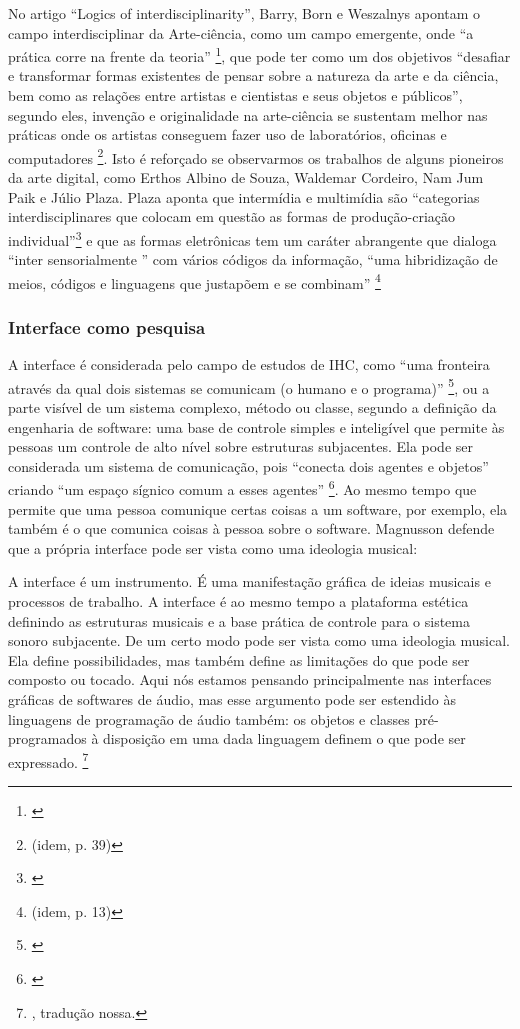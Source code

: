 No artigo ``Logics of interdisciplinarity'', Barry, Born e Weszalnys apontam o campo interdisciplinar da Arte-ciência, como um campo emergente, onde ``a prática corre na frente da teoria'' \footnote{\cite{Barry2008}}, que pode ter como um dos objetivos ``desafiar e transformar formas existentes de pensar sobre a natureza da arte e da ciência, bem como as relações entre artistas e cientistas e seus objetos e públicos'', segundo eles, invenção e originalidade na arte-ciência se sustentam melhor nas práticas onde os artistas conseguem fazer uso de laboratórios, oficinas e computadores \footnote{(idem, p. 39)}. Isto é reforçado se observarmos os trabalhos de alguns pioneiros da arte digital, como Erthos Albino de Souza, Waldemar Cordeiro, Nam Jum Paik e Júlio Plaza. 
Plaza aponta que intermídia e multimídia são ``categorias interdisciplinares  que colocam em questão as formas de produção-criação individual''\footnote{\cite[66]{JulioPlaza1969}} e que as formas eletrônicas tem um caráter abrangente que dialoga ``inter sensorialmente '' com vários códigos da informação, ``uma hibridização de meios, códigos e linguagens que justapõem e se combinam'' \footnote{(idem, p. 13)}




\subsubsection{Interface como pesquisa}
A interface é considerada pelo campo de estudos de IHC, como “uma fronteira através da qual dois sistemas se comunicam (o humano e o programa)” \footnote{\cite{Magnusson2005}}, ou a parte visível de um sistema complexo, método ou classe, segundo a definição da engenharia de software: uma base de controle simples e inteligível que permite às pessoas um controle de alto nível sobre estruturas subjacentes. Ela pode ser considerada um sistema de comunicação, pois “conecta dois agentes e objetos” criando “um espaço sígnico comum a esses agentes” \footnote{\cite[105]{IAZZETTA1997}}. Ao mesmo tempo que permite que uma pessoa comunique certas coisas a um software, por exemplo, ela também é o que comunica coisas à pessoa sobre o software. Magnusson \citeyear{Magnusson2005} defende que a própria interface pode ser vista como uma ideologia musical: 

\begin{citacao}
A interface é um instrumento. É uma manifestação gráfica de ideias musicais e processos de trabalho. A interface é ao mesmo tempo a plataforma estética definindo as estruturas musicais e a base prática de controle para o sistema sonoro subjacente. De um certo modo pode ser vista como uma ideologia musical. Ela define possibilidades, mas também define as limitações do que pode ser composto ou tocado. Aqui nós estamos pensando principalmente nas interfaces gráficas de softwares de áudio, mas esse argumento pode ser estendido às linguagens de programação de áudio também: os objetos e classes pré-programados à disposição em uma dada linguagem definem o que pode ser expressado. \footnote{\cite[212]{Magnusson2005}, tradução nossa.}
\end{citacao}

